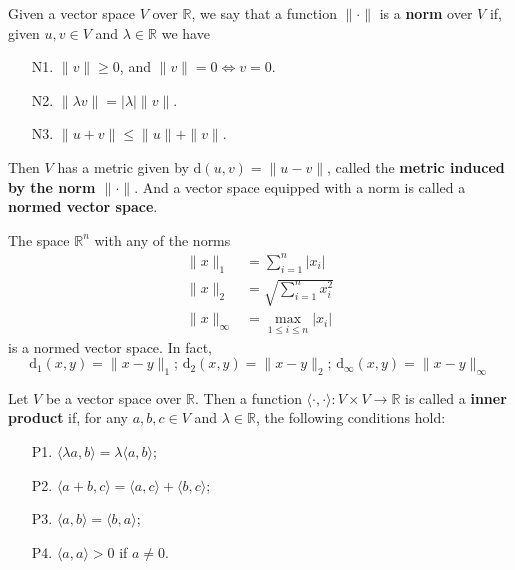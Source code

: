 \begin{definition}
	Given a vector space $V$ over $\mathbb{R}$, we say that a function $\| \cdot \|$ is a \textbf{norm} over $V$ if, given $u, v \in V$ and $\lambda \in \mathbb{R}$ we have
	\begin{itemize}
	\item[N1.] $\| v \| \geq 0$, and $\| v \| = 0 \iff v = 0$.
	\item[N2.] $\| \lambda v \| = |\lambda| \| v \|$.
	\item[N3.] $\| u + v \| \leq \| u \| + \| v \|$.
	\end{itemize}
	Then $V$ has a metric given by $\mathrm{d}(u,v) = \| u - v \|$, called the \textbf{metric induced by the norm $\| \cdot \|$}. And a vector space equipped with a norm is called a \textbf{normed vector space}.
\end{definition}

\begin{example}
	The space $\mathbb{R}^n$ with any of the norms	
	\begin{equation*}
		\begin{aligned}
			\| x \|_1 &= \sum_{i=1}^n |x_i| \\
			\| x \|_2 &= \sqrt{\sum_{i=1}^n x_i^2} \\
			\| x \|_\infty &= \max_{1 \leq i \leq n} |x_i|
		\end{aligned}
	\end{equation*}	
	is a normed vector space. In fact,
	\[
		\mathrm{d}_1(x,y) = \| x- y \|_1; \, \mathrm{d}_2(x,y) = \| x - y \|_2; \, \mathrm{d}_\infty (x,y) = \| x- y \|_\infty
	\]
\end{example}

\begin{definition}\label{def:inner-product}
	Let $V$ be a vector space over $\mathbb{R}$. Then a function $\langle \cdot, \cdot \rangle : V \times V \longrightarrow \mathbb{R}$ is called a \textbf{inner product} if, for any $a, b, c \in V$ and $\lambda \in \mathbb{R}$, the following conditions hold:
	\begin{enumerate}
		\item[P1.] $\langle \lambda a, b \rangle = \lambda \langle a, b \rangle$;
		\item[P2.] $\langle a + b, c \rangle = \langle a, c \rangle + \langle b, c \rangle$;
		\item[P3.] $\langle a, b \rangle = \langle b, a \rangle$;
		\item[P4.] $\langle a, a \rangle > 0$ if $a \neq 0$.
	\end{enumerate}
\end{definition}

